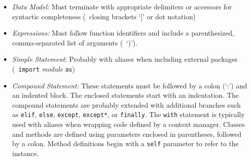 \begin{itemize}
    \item \textit{Data Model:} Must terminate with appropriate delimiters or accessors for syntactic completeness (\eg~closing brackets `]' or dot notation)
    \item \textit{Expressions:} Must follow function identifiers and include a parenthesized, comma-separated list of arguments (\eg~`)').
    \item \textit{Simple Statement}: Probably with aliases when including external packages (\eg~\texttt{import} \textit{module} \texttt{as})
    \item \textit{Compound Statement:} These statements must be followed by a colon (`:') and an indented block. The enclosed statements start with an indentation. The compound statements are probably extended with additional branches such as \texttt{elif}, \texttt{else}, \texttt{except}, \texttt{except*}, or \texttt{finally}. The \texttt{with} statement is typically used with aliases when wrapping code defined by a context manager. Classes and methods are defined using parameters enclosed in parentheses, followed by a colon. Method definitions begin with a \texttt{self} parameter to refer to the instance.
\end{itemize}








